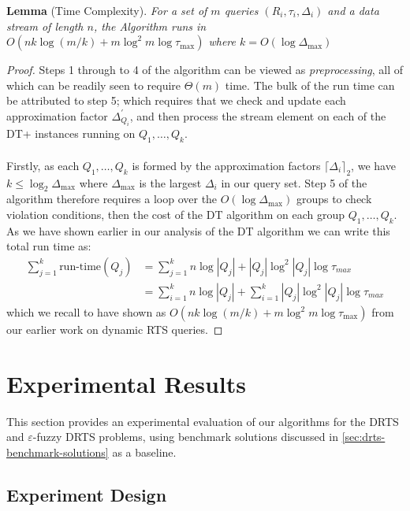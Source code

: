 \textbf{Lemma} (Time Complexity). \textit{For a set of $m$ queries $(R_i, \tau_i, \Delta_i)$  
 and a data stream of length $n$, the Algorithm runs in $O(nk\log (m/k) + m\log^2 m \log\tau_{\text{max}})$ where $k = O(\log \Delta_{\text{max}})$} 
 \begin{proof}
    Steps 1 through to 4 of the algorithm can be viewed as \textit{preprocessing}, all of which can be readily seen to require $\Theta(m)$ time. The bulk of the run time can be attributed to step 5; which requires that we check and update each approximation factor $\Delta^\prime_{Q_i}$, and then process the stream element on each of the DT+ instances running on $Q_1,\dots, Q_k$. \\
    \\
    Firstly, as each $Q_1,\dots, Q_k$ is formed by the approximation factors $\lceil \Delta_i\rceil_2$, we have $k\leq \log_2\Delta_{\text{max}}$ where $\Delta_{\text{max}}$ is the largest $\Delta_i$ in our query set. Step 5 of the algorithm therefore requires a loop over the $O(\log\Delta_{\text{max}})$ groups to check violation conditions, then the cost of the DT algorithm on each group $Q_1,\dots,Q_k$. As we have shown earlier in our analysis of the DT algorithm we can write this total run time as: 
    \begin{align*}
        \sum_{j=1}^{k}\text{run-time}(Q_{j}) &= \sum_{j=1}^{k} n\log |Q_j| + |Q_j|\log^2 |Q_j| \log\tau_{max} \\
        &= \sum_{i=1}^{k} n\log |Q_j| + \sum_{i=1}^{k}  |Q_j|\log^2 |Q_j| \log\tau_{max} 
    \end{align*}
    which we recall to have shown as $O(nk\log (m/k) + m\log^2 m \log\tau_{\text{max}})$ from our earlier work on dynamic RTS queries.
\end{proof} 


\newpage
\section{Experimental Results}
\label{sec:experimental-results}
This section provides an experimental evaluation of our algorithms for the DRTS and $\varepsilon$-fuzzy DRTS problems, using benchmark solutions discussed in \cref{sec:drts-benchmark-solutions} as a baseline. 

\subsection{Experiment Design}
\label{sec:experiment-design}

